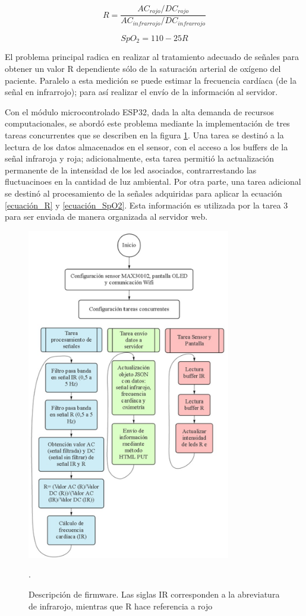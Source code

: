 \documentclass[journal]{IEEEtran}
\begin{document}
\begin{equation}
	R=\frac{AC_{rojo}/DC_{rojo}}{AC_{infrarrojo}/DC_{infrarrojo}}
	\label{ecuación_R}
\end{equation}

\begin{equation}
	SpO_2 = 110-25R
	\label{ecuación_SpO2}
\end{equation}


El problema principal radica en realizar al tratamiento adecuado de señales para obtener un valor R dependiente sólo de la saturación arterial de oxígeno del paciente. Paralelo a esta medición se puede estimar la frecuencia cardíaca (de la señal en infrarrojo); para así realizar el envío de la información al servidor. 

Con el módulo microcontrolado ESP32, dada la alta demanda de recursos computacionales, se abordó este problema mediante la implementación de tres tareas concurrentes que se describen en la figura \ref{Descripción_firmware}. Una tarea se destinó a la lectura de los datos almacenados en el sensor, con el acceso a los buffers de la señal infraroja y roja; adicionalmente, esta tarea permitió la actualización permanente de la intensidad de los led asociados, contrarrestando las fluctuacinoes en la cantidad de luz ambiental. Por otra parte, una tarea adicional se destinó al procesamiento de la señales adquiridas para aplicar la ecuación \ref{ecuación_R} y \ref{ecuación_SpO2}. Esta información es utilizada por la tarea 3 para ser enviada de manera organizada al servidor web.


\begin{figure}[!h]
	\centering
	\includegraphics[width=3.5in]{diagrama_flujo.png}
	\caption{Descripción de firmware. Las siglas IR corresponden a la abreviatura de infrarojo, mientras que R hace referencia a rojo}.
	\label{Descripción_firmware}
\end{figure}
\end{document}
